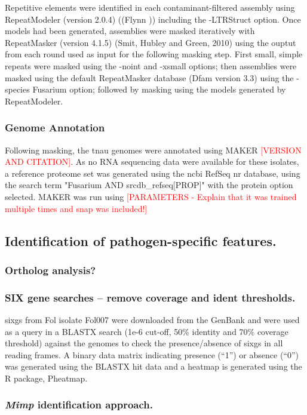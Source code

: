 Repetitive elements were identified in each contaminant-filtered assembly using RepeatModeler (version 2.0.4) ((Flynn )) including the -LTRStruct option. Once models had been generated, assemblies were masked iteratively with RepeatMasker (version 4.1.5) (Smit, Hubley and Green, 2010) using the ouptut from each round used as input for the following masking step. First small, simple repeats were masked using the -noint and -xsmall options; then assemblies were masked using the default RepeatMasker database (Dfam version 3.3) using the -species Fusarium option; followed by masking using the models generated by RepeatModeler.

\subsubsection{Genome Annotation}
Following masking, the \ac{tnau} genomes were annotated using MAKER \textcolor{red}{[VERSION AND CITATION]}. As no RNA sequencing data were available for these isolates, a reference proteome set was generated using the \ac{ncbi} RefSeq nr database, using the search term "Fusarium AND srcdb\_refseq[PROP]" with the protein option selected. MAKER was run using \textcolor{red}{[PARAMETERS - Explain that it was trained multiple times and snap was included!]}

\subsection{Identification of pathogen-specific features.}

\subsubsection{Ortholog analysis?}

\subsubsection{SIX gene searches – remove coverage and ident thresholds.}
\Acp{sixg} from Fol isolate Fol007 were downloaded from the GenBank and were used as a query in a BLASTX search (1e-6 cut-off, 50\% identity and 70\% coverage threshold) against the genomes to check the presence/absence of \acp{sixg} in all reading frames. A binary data matrix indicating presence (“1”) or absence (“0”) was generated using the BLASTX hit data and a heatmap is generated using the R package, Pheatmap.

\subsubsection{\textit{Mimp} identification approach.}

